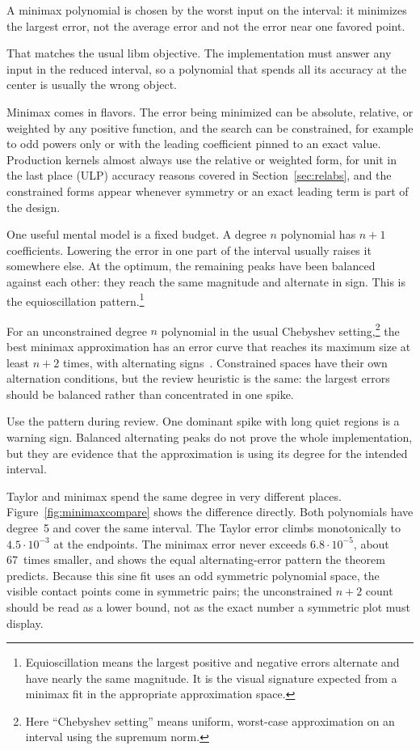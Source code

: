 \documentclass[manuscript, nonacm]{acmart}
\begin{document}
    A minimax polynomial is chosen by the worst input on the interval: it minimizes
    the largest error, not the average error and not the error near one favored
    point.

    That matches the usual libm objective. The implementation must answer any
    input in the reduced interval, so a polynomial that spends all its accuracy at
    the center is usually the wrong object.

    Minimax comes in flavors. The error being minimized can be absolute,
    relative, or weighted by any positive function, and the search can be
    constrained, for example to odd powers only or with the leading
    coefficient pinned to an exact value. Production kernels almost always
    use the relative or weighted form, for unit in the last place (ULP) accuracy reasons covered in
    Section~\ref{sec:relabs}, and the constrained forms appear whenever
    symmetry or an exact leading term is part of the design.

    One useful mental model is a fixed budget. A degree $n$ polynomial has
    $n + 1$ coefficients. Lowering the error in one part of the interval usually
    raises it somewhere else. At the optimum, the remaining peaks have been
    balanced against each other: they reach the same magnitude and alternate in
    sign. This is the equioscillation pattern.\footnote{Equioscillation means the largest positive and negative errors alternate and have nearly the same magnitude. It is the visual signature expected from a minimax fit in the appropriate approximation space.}

    For an unconstrained degree $n$ polynomial in the usual Chebyshev setting,\footnote{Here ``Chebyshev setting'' means uniform, worst-case approximation on an interval using the supremum norm.}
    the best minimax approximation has an error curve that reaches its maximum
    size at least $n + 2$ times, with alternating signs~\cite{muller}.
    Constrained spaces have their own alternation conditions, but the review
    heuristic is the same: the largest errors should be balanced rather than
    concentrated in one spike.

    Use the pattern during review. One dominant spike with long quiet regions is
    a warning sign. Balanced alternating peaks do not prove the whole
    implementation, but they are evidence that the approximation is using its degree
    for the intended interval.

    Taylor and minimax spend the same degree in very different places.
    Figure~\ref{fig:minimaxcompare} shows the difference directly. Both
    polynomials have degree~5 and cover the same interval. The Taylor error
    climbs monotonically to $4.5 \cdot 10^{-3}$ at the endpoints. The minimax
    error never exceeds $6.8 \cdot 10^{-5}$, about 67~times smaller, and shows
    the equal alternating-error pattern the theorem predicts. Because this sine fit
    uses an odd symmetric polynomial space, the visible contact points come in
    symmetric pairs; the unconstrained $n+2$ count should be read as a lower bound,
    not as the exact number a symmetric plot must display.
\end{document}
